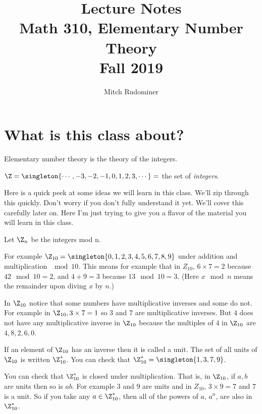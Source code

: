 \documentclass[oneside,12pt]{amsart}
\begin{document}
\title{Lecture Notes \\ Math 310, Elementary Number Theory \\ Fall 2019}
\author{Mitch Rudominer}

\maketitle

\tableofcontents


\section{What is this class about?}

Elementary number theory is the theory of the integers.

$\Z = \singleton{\cdots, -3, -2, -1, 0, 1, 2, 3, \cdots} = $ the set of \emph{integers}.

Here is a quick peek at some ideas we will learn in this class. We'll zip through this quickly. Don't
worry if you don't fully understand it yet. We'll cover this carefully later on. Here I'm just trying
to give you a flavor of the material you will learn in this class.

Let $\Z_n$ be the integers mod n.

For example $\Z_{10} = \singleton{0,1,2,3,4,5,6,7,8,9}$ under addition and multiplication $\mod 10.$ This means for example that in $Z_{10}$,
$6 \times 7 = 2$ because $42 \mod 10 = 2$, and $4 + 9 = 3$ because $13 \mod 10 = 3$.
(Here $x \mod n$ means the remainder upon diving $x$ by $n$.)

In $\Z_{10}$ notice that some numbers have multiplicative inverses and some do not. For
example in $\Z_{10}, 3 \times 7 = 1$ so $3$ and $7$ are multiplicative inverses. But $4$ does not have any
multiplicative inverse in $\Z_{10}$ because the multiples of $4$ in $\Z_{10}$ are $4, 8, 2, 6, 0$.

If an element of $\Z_{10}$ has an inverse then it is called a unit. The set of all units of
$\Z_{10}$ is written $\Z^*_{10}$. You can check that
$\Z^*_{10} = \singleton{1,3,7,9}$.

You can check that $\Z^*_{10}$ is closed under multiplication. That is, in $\Z_{10}$, if
$a,b$ are units then so is $ab$. For example 3 and 9 are units and in $Z_{10}$, $3\times 9 = 7$
and $7$ is a unit. So if you take any $a\in \Z^*_{10}$, then all of the powers of $a$, $a^n$, are
also in $\Z^*_{10}$.
\end{document}
